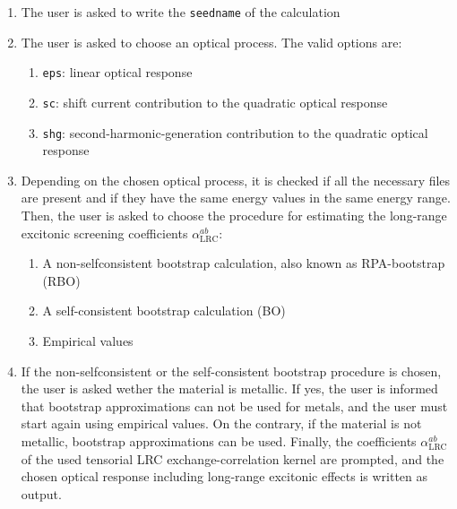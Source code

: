 \begin{enumerate}
 \item The user is asked to write the \verb|seedname| of the calculation
 \item The user is asked to choose an optical process. The valid options are:
 \begin{enumerate}
  \item \verb|eps|: linear optical response
  \item \verb|sc|: shift current contribution to the quadratic optical response
  \item \verb|shg|: second-harmonic-generation contribution to the quadratic optical response
 \end{enumerate}
 \item Depending on the chosen optical process, it is checked if all the necessary files are present and if they have the same energy values in the same energy range. Then, the user is asked to choose the procedure for estimating the long-range excitonic screening coefficients $\alpha^{ab}_{\mathrm{LRC}}$:
 \begin{enumerate}
  \item A non-selfconsistent bootstrap calculation, also known as RPA-bootstrap (RBO)~\cite{PhysRevLett.114.146402,PhysRevLett.115.137402}
  \item A self-consistent bootstrap calculation (BO)~\cite{PhysRevLett.107.186401}
  \item Empirical values
 \end{enumerate}
 \item If the non-selfconsistent or the self-consistent bootstrap procedure is chosen, the user is asked wether the material is metallic. If yes, the user is informed that bootstrap approximations can not be used for metals, and the user must start again using empirical values. On the contrary, if the material is not metallic, bootstrap approximations can be used. Finally, the coefficients $\alpha^{ab}_{\mathrm{LRC}}$ of the used tensorial LRC exchange-correlation kernel are prompted, and the chosen optical response including long-range excitonic effects is written as output.
\end{enumerate}

